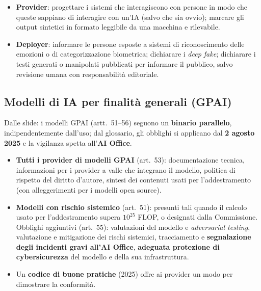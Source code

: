 \begin{integrazione}
\begin{itemize}
  \item \textbf{Provider}: progettare i sistemi che interagiscono con persone in modo che queste
    sappiano di interagire con un'IA (salvo che sia ovvio); marcare gli output sintetici in formato
    leggibile da una macchina e rilevabile.
  \item \textbf{Deployer}: informare le persone esposte a sistemi di riconoscimento delle emozioni o di
    categorizzazione biometrica; dichiarare i \emph{deep fake}; dichiarare i testi generati o
    manipolati pubblicati per informare il pubblico, salvo revisione umana con responsabilità
    editoriale.
\end{itemize}
\end{integrazione}

\subsection{Modelli di IA per finalità generali (GPAI)}
\label{sec:aiact-gpai}
Dalle slide: i modelli GPAI (artt.~51--56) seguono un \textbf{binario parallelo}, indipendentemente
dall'uso; dal glossario, gli obblighi si applicano dal \textbf{2 agosto 2025} e la vigilanza spetta
all'\textbf{AI Office}.

\begin{integrazione}[artt.~51--55]
\begin{itemize}
  \item \textbf{Tutti i provider di modelli GPAI} (art.~53): documentazione tecnica, informazioni per i
    provider a valle che integrano il modello, politica di rispetto del diritto d'autore, sintesi dei
    contenuti usati per l'addestramento (con alleggerimenti per i modelli open source).
  \item \textbf{Modelli con rischio sistemico} (art.~51): presunti tali quando il calcolo usato per
    l'addestramento supera $10^{25}$ FLOP, o designati dalla Commissione. Obblighi aggiuntivi
    (art.~55): valutazioni del modello e \emph{adversarial testing}, valutazione e mitigazione dei rischi
    sistemici, tracciamento e \textbf{segnalazione degli incidenti gravi all'AI Office},
    \textbf{adeguata protezione di cybersicurezza} del modello e della sua infrastruttura.
  \item Un \textbf{codice di buone pratiche} (2025) offre ai provider un modo per dimostrare la
    conformità.
\end{itemize}
\end{integrazione}

